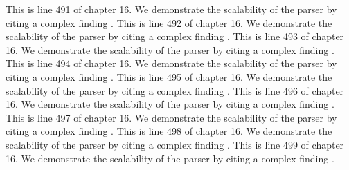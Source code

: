 This is line 491 of chapter 16. We demonstrate the scalability of the parser by citing a complex finding \cite{ref16_491}.
This is line 492 of chapter 16. We demonstrate the scalability of the parser by citing a complex finding \cite{ref16_492}.
This is line 493 of chapter 16. We demonstrate the scalability of the parser by citing a complex finding \cite{ref16_493}.
This is line 494 of chapter 16. We demonstrate the scalability of the parser by citing a complex finding \cite{ref16_494}.
This is line 495 of chapter 16. We demonstrate the scalability of the parser by citing a complex finding \cite{ref16_495}.
This is line 496 of chapter 16. We demonstrate the scalability of the parser by citing a complex finding \cite{ref16_496}.
This is line 497 of chapter 16. We demonstrate the scalability of the parser by citing a complex finding \cite{ref16_497}.
This is line 498 of chapter 16. We demonstrate the scalability of the parser by citing a complex finding \cite{ref16_498}.
This is line 499 of chapter 16. We demonstrate the scalability of the parser by citing a complex finding \cite{ref16_499}.


